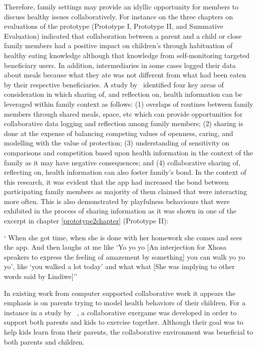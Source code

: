 Therefore, family settings may provide an idyllic opportunity for members to discuss healthy issues collaboratively. For instance on the three chapters on evaluations of the prototype (Prototype I, Prototype II, and Summative Evaluation) indicated that collaboration between a parent and a child or close family members had a positive impact on children's through habituation of healthy eating knowledge although that knowledge from self-monitoring targeted beneficiary users. In addition, intermediaries in some cases logged their data about meals because what they ate was not different from what had been eaten by their respective beneficiaries. A study by~\cite{grimes2009toward} identified four key areas of consideration in which sharing of, and reflection on, health information can be leveraged within family context as follows: (1) overlaps of routines between family members through shared meals, space, etc which can provide opportunities for collaborative data logging and reflection among family members; (2) sharing is done at the expense of balancing competing values of openness, caring, and modelling with the value of protection; (3) understanding of sensitivity on comparisons and competition based upon health information in the context of the family as it may have negative consequences; and (4) collaborative sharing of, reflecting on, health information can also foster family's bond. In the context of this research, it was evident that the app had increased the bond between participating family members as majority of them claimed that were interacting more often. This is also demonstrated by playfulness behaviours that were exhibited in the process of sharing information as it was shown in one of the excerpt in chapter \ref{prototype2chapter} (Prototype II):

 {` When she got time, when she is done with her homework she comes and sees the app. And then laughs at me like `Yo yo yo [An interjection for Xhosa speakers to express the feeling of amazement by something] you can walk yo yo yo', like `you walked a lot today' and what what [She was implying to other words said by Lindiwe]''}

In existing work from computer supported collaborative work it appears the emphasis is on parents trying to model health behaviors of their children.  For a instance in a study by ~\cite{saksono2015spaceship}, a collaborative exergame was developed in order to support both parents and kids to exercise together. Although their goal was to help kids learn from their parents, the collaborative environment was beneficial to both parents and children. 

